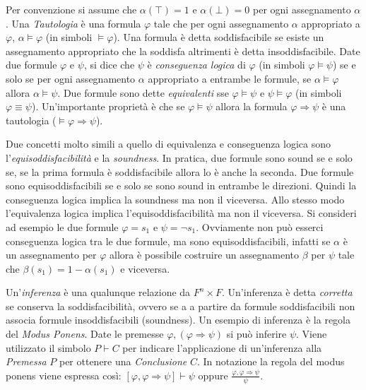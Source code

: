 \documentclass[./main.tex]{subfiles}
\begin{document}
Per convenzione si assume che $\alpha(\top) = 1$ e $\alpha(\bot) = 0$ per ogni assegnamento $\alpha$.
Una \textit{Tautologia} è una formula $\varphi$ tale che per ogni assegnamento $\alpha$ appropriato a $\varphi$, $\alpha \models \varphi$ (in simboli $\models \varphi$).
Una formula è detta soddisfacibile se esiste un assegnamento appropriato che la soddisfa altrimenti è detta insoddisfacibile.
Date due formule $\varphi$ e $\psi$, si dice che $\psi$ è \textit{conseguenza logica} di $\varphi$ (in simboli $\varphi \models \psi$) 
se e solo se per ogni assegnamento $\alpha$ appropriato a entrambe le formule, se $\alpha \models \varphi$ allora $\alpha \models \psi$.
Due formule sono dette \textit{equivalenti} sse $\varphi \models \psi$ e $\psi \models \varphi$ (in simboli $\varphi \equiv \psi$).
Un'importante proprietà è che se $\varphi \models \psi$ allora la formula $\varphi \Rightarrow \psi$ 
è una tautologia ($\models \varphi \Rightarrow \psi$).

Due concetti molto simili a quello di equivalenza e conseguenza logica sono l'\textit{equisoddisfacibilità} e la \textit{soundness}. In pratica, due formule sono sound
se e solo se, se la prima formula è soddisfacibile allora lo è anche la seconda. Due formule sono equisoddisfacibili se e solo se sono sound in entrambe le direzioni. 
Quindi la conseguenza logica implica la soundness ma non il viceversa. Allo stesso modo l'equivalenza
logica implica l'equisoddisfacibilità ma non il viceversa. Si consideri ad esempio le due formule $\varphi = s_1$ e $\psi = \lnot s_1$. Ovviamente non 
può esserci conseguenza logica tra le due formule, ma sono equisoddisfacibili, infatti se $\alpha$ è un assegnamento per $\varphi$ allora è possibile
costruire un assegnamento $\beta$ per $\psi$ tale che $\beta(s_1) = 1-\alpha(s_1)$ e viceversa.

Un'\textit{inferenza} è una qualunque relazione da $F^n \times F$. Un'inferenza è detta \textit{corretta} se conserva la soddisfacibilità, ovvero 
se a a partire da formule soddisfacibili non associa formule insoddisfacibili (soundness).
Un esempio di inferenza è la regola del \textit{Modus Ponens}. Date le premesse $\varphi, (\varphi \Rightarrow \psi)$ si può inferire $\psi$.
Viene utilizzato il simbolo $P \vdash C$ per indicare l'applicazione di un'inferenza alla \textit{Premessa} $P$ per ottenere una \textit{Conclusione} $C$.
In notazione la regola del modus ponens viene espressa così: $[\varphi, \varphi \Rightarrow \psi] \vdash \psi$ oppure
$\frac{\varphi, \varphi \Rightarrow \psi}{\psi} $.
\end{document}
